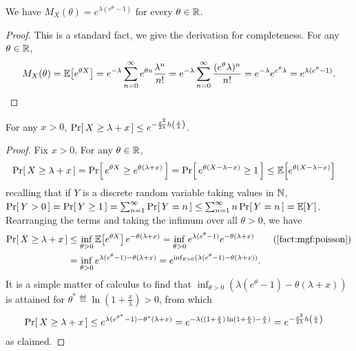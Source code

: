 \documentclass[10pt]{article}
\newcommand{\bennettfunc}{h}
\newcommand{\bennett}[1]{\bennettfunc\mleft(#1\mright)}
\begin{document}
\begin{fact}\label{fact:mgf:poisson}
  We have $M_X(\theta) = e^{\lambda(e^\theta-1)}$ for every $\theta \in \mathbb{R}$.
\end{fact}
\begin{proof}
This is a standard fact, we give the derivation for completeness. For any $\theta\in\mathbb{R}$,
\[
    M_X(\theta) = \mathbb{E}\!\left[e^{\theta X}\right] = e^{-\lambda}\sum_{n=0}^\infty e^{\theta n}\frac{\lambda^n}{n!} = e^{-\lambda}\sum_{n=0}^\infty \frac{(e^\theta \lambda)^n}{n!} = e^{-\lambda} e^{e^\theta \lambda}
    = e^{\lambda(e^\theta-1)}.
\]
\end{proof}

\begin{fact}\label{fact:poisson:upper:tail}
  For any $x>0$, $\probaOf{ X \geq \lambda + x} \leq e^{-\frac{x^2}{2\lambda}\bennett{\frac{x}{\lambda}}}$.
\end{fact}
\begin{proof}
Fix $x> 0$. For any $\theta\in\mathbb{R}$,
\begin{align*}
    \Pr\!\left[\,  X \geq \lambda + x\, \right]
    &= \Pr\!\left[\,  e^{\theta X} \geq e^{\theta(\lambda + x)} \, \right]
    = \Pr\!\left[\,  e^{\theta(X - \lambda -x)} \geq 1\, \right]
    \leq \mathbb{E}\!\left[ e^{\theta(X - \lambda -x)} \right] 
\end{align*}
recalling that if $Y$ is a discrete random variable taking values in $\mathbb{N}$, $\Pr\!\left[\, Y > 0\, \right]=\Pr\!\left[\, Y \geq 1\, \right] = \sum_{n=1}^\infty \Pr\!\left[\, Y = n\, \right] \leq \sum_{n=1}^\infty n\Pr\!\left[\, Y = n\, \right] = \mathbb{E}\!\left[Y\right]$. Rearranging the terms and taking the infimum over all $\theta > 0$, we have
\begin{align*}
    \probaOf{ X \geq \lambda + x}
    &\leq \inf_{\theta > 0}\expect{ e^{\theta X} }e^{-\theta(\lambda+x)} = \inf_{\theta > 0}e^{\lambda(e^\theta-1)}e^{-\theta(\lambda+x)} \tag{\autoref{fact:mgf:poisson}} \\
    &= \inf_{\theta > 0}e^{\lambda(e^\theta-1) -\theta(\lambda+x)}
    = e^{\inf_{\theta > 0}( \lambda(e^\theta-1) -\theta(\lambda+x))}.
\end{align*}
It is a simple matter of calculus to find that $\inf_{\theta > 0}( \lambda(e^\theta-1) -\theta(\lambda+x))$ is attained for $\theta^\ast \eqdef \ln(1+\frac{x}{\lambda}) > 0$, from which
\begin{align*}
    \probaOf{ X \geq \lambda + x}
    &\leq e^{\lambda(e^{\theta^\ast}-1) -\theta^\ast(\lambda+x)}
    = e^{-\lambda((1+\frac{x}{\lambda})\ln(1+\frac{x}{\lambda})-\frac{x}{\lambda})} 
    = e^{-\frac{x^2}{2\lambda}\bennett{\frac{x}{\lambda}}} 
\end{align*}
as claimed.
\end{proof}
\end{document}
